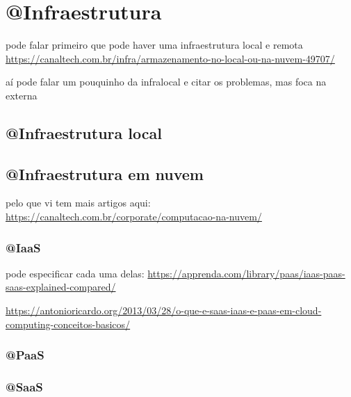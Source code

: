 \chapter{@Infraestrutura}

pode falar primeiro que pode haver uma infraestrutura local e remota
\url{https://canaltech.com.br/infra/armazenamento-no-local-ou-na-nuvem-49707/}

aí pode falar um pouquinho da infralocal e citar os problemas,
mas foca na externa

\section{@Infraestrutura local}

\section{@Infraestrutura em nuvem}

pelo que vi tem mais artigos aqui: \url{https://canaltech.com.br/corporate/computacao-na-nuvem/}

\subsection{@IaaS}

pode especificar cada uma delas:
\url{https://apprenda.com/library/paas/iaas-paas-saas-explained-compared/}

\url{https://antonioricardo.org/2013/03/28/o-que-e-saas-iaas-e-paas-em-cloud-computing-conceitos-basicos/}

\subsection{@PaaS}

\subsection{@SaaS}
